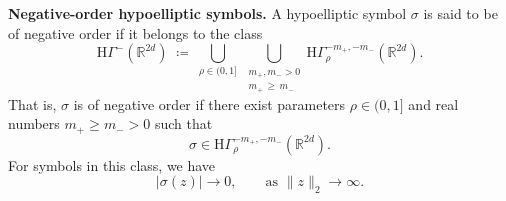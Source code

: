 \documentclass[a4paper,12pt]{article}
\let\originalleft\left
\let\originalright\right
\renewcommand{\left}{\mathopen{}\mathclose\bgroup\originalleft}
\renewcommand{\right}{\aftergroup\egroup\originalright}
\newcommand{\R}{\mathbb{R}}
\newcommand{\hyposymbclass}{\text{H}\Gamma^{m_-,m_+}_\rho}
\newcommand{\hyposymbclassinv}{\mathrm{H}\Gamma^{-m_+,-m_-}_\rho}
\newcommand{\hyponegclass}{\mathrm{H}\Gamma^-}
\newcommand{\hypoposclass}{\mathrm{H}\Gamma^+}
\begin{document}

\noindent 
\textbf{Negative-order hypoelliptic symbols.}
A hypoelliptic symbol $\sigma$ is said to be of negative order if it belongs
to the class
\begin{equation}\label{eq:negative-order-def-class}
\hyponegclass(\R^{2d})
\;\coloneqq\;
\bigcup_{\rho\in(0,1]}
\ \bigcup_{\substack{m_+,m_->0\\ m_+\,\ge\, m_-}}
\mathrm{H}\Gamma^{-m_+,-m_-}_\rho(\R^{2d}).
\end{equation}
That is, $\sigma$ is of negative order if there exist parameters $\rho\in(0,1]$
and real numbers $m_+\ge m_->0$ such that
\[
\sigma \in \mathrm{H}\Gamma^{-m_+,-m_-}_\rho(\R^{2d}).
\]
For symbols in this class, we have
\[
|\sigma(z)| \to 0,
\qquad \text{as } \|z\|_2 \to \infty.
\]



\end{document}
